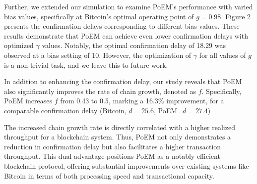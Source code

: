 Further, we extended our simulation to examine PoEM's performance with varied
bias values, specifically at Bitcoin's optimal operating point of $g=0.98$.
Figure 2 presents the confirmation delays corresponding to different bias
values. These results demonstrate that PoEM can achieve even lower confirmation
delays with optimized $\gamma$ values. Notably, the optimal confirmation delay
of 18.29 was observed at a bias setting of 10. However, the optimization of
$\gamma$ for all values of $g$ is a non-trivial task, and we leave this to
future work.

In addition to enhancing the confirmation delay, our study reveals that PoEM
also significantly improves the rate of chain growth, denoted as $f$.
Specifically, PoEM increases $f$ from 0.43 to 0.5, marking a 16.3\%
improvement, for a comparable confirmation delay (Bitcoin, $d=25.6$,
PoEM=$d=27.4$)

The increased chain growth rate is directly correlated with a higher realized
throughput for a blockchain system. Thus, PoEM not only demonstrates a
reduction in confirmation delay but also facilitates a higher transaction
throughput. This dual advantage positions PoEM as a notably efficient
blockchain protocol, offering substantial improvements over existing systems
like Bitcoin in terms of both processing speed and transactional capacity.

